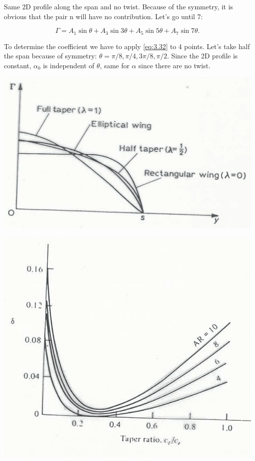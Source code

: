 	Same 2D profile along the span and no twist. Because of the symmetry, it is obvious that the pair n will have no contribution. Let's go until 7:
	
	\begin{equation}
	\Gamma = A_1\sin \theta + A_3\sin 3\theta + A_5\sin 5\theta + A_7\sin 7\theta.
	\end{equation}
	
	To determine the coefficient we have to apply \eqref{eq:3.32} to 4 points. Let's take half the span because of symmetry: $\theta = \pi /8, \pi /4, 3\pi /8, \pi /2$. Since the 2D profile is constant, $\alpha _0$ is independent of $\theta$, same for $\alpha$ since there are no twist. 
	
	\begin{center}
	\begin{minipage}{0.4\textwidth}
	\includegraphics[scale=0.15]{ch3/23}
	\label{fig:3.23}
	\end{minipage}
	\begin{minipage}{0.22\textwidth}
	\includegraphics[scale=0.12]{ch3/24}
	\label{fig:3.24}
	\end{minipage}
	\end{center}
	
